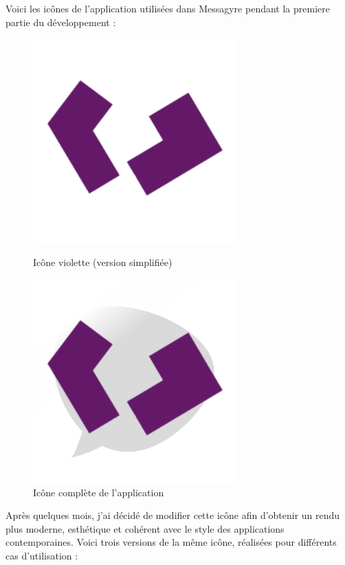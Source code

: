 \documentclass[12pt]{report}
\begin{document}
	Voici les icônes de l'application utilisées dans Messagyre pendant la premiere partie du développement :
	
	\begin{figure}[H]
		\centering
		\begin{minipage}[t]{0.45\textwidth}
			\centering
			\includegraphics[width=0.7\textwidth]{img/logo_purple.png}
			\caption{Icône violette (version simplifiée)}
		\end{minipage}
		\hfill
		\begin{minipage}[t]{0.45\textwidth}
			\centering
			\includegraphics[width=0.7\textwidth]{img/logo_full.png}
			\caption{Icône complète de l’application}
		\end{minipage}
	\end{figure}
	
	Après quelques mois, j’ai décidé de modifier cette icône afin d’obtenir un rendu plus moderne, esthétique et cohérent avec le style des applications contemporaines. Voici trois versions de la même icône, réalisées pour différents cas d’utilisation :
	
\end{document}

